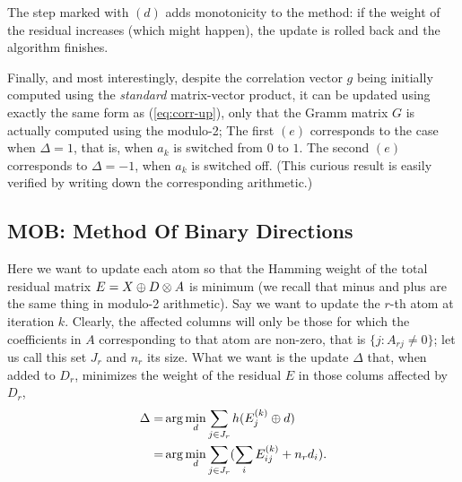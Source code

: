 \documentclass[twocolumn]{IEEEtran}
\theoremstyle{definition}
\def\transp{^\intercal}
\newcommand{\refeq}[1]{(\ref{#1})}
\begin{document}
The step marked with $(d)$ adds monotonicity to the method: if the weight of the residual increases (which might happen), the update is rolled back and the algorithm finishes.

Finally, and most interestingly, despite the correlation vector $g$ being initially computed using the \emph{standard} matrix-vector product, it can be updated using exactly the same form as \refeq{eq:corr-up}, only that the Gramm matrix $G$ is actually computed using the modulo-2; The first $(e)$ corresponds to the case when $\Delta=1$, that is, when $a_k$ is switched from $0$ to $1$. The second $(e)$ corresponds to $\Delta=-1$, when $a_k$ is switched off. (This curious result is easily verified by writing down the corresponding arithmetic.) 

%
%
%  
\subsection{MOB: Method Of Binary Directions}
\label{sec:bdl:mod}
 
Here we want to update each atom so that the Hamming weight of the total residual matrix $E = X \oplus D \otimes A$ is minimum (we recall that minus and plus are the same thing in modulo-2 arithmetic). Say we want to update the $r$-th atom at iteration $k$. Clearly, the affected columns will only be those for which the  coefficients in $A$  corresponding to that atom are non-zero, that is $\{j : A_{rj} \neq 0 \}$; let us call this set $J_r$ and $n_r$ its size. What we want is the update $\Delta$ that, when added to $D_r$, minimizes the weight of the residual $E$ in those colums affected by $D_r$,
 \begin{eqnarray}
 \Delta  =& \arg\min_d \sum_{j \in J_r}  h(E\iter{k}_j \oplus d) \\
 =& \arg\min_d \sum_{j \in J_r} (\sum_i E\iter{k}_{ij} + n_r d_i).
\label{eq:mob1}
 \end{eqnarray}
\end{document}
